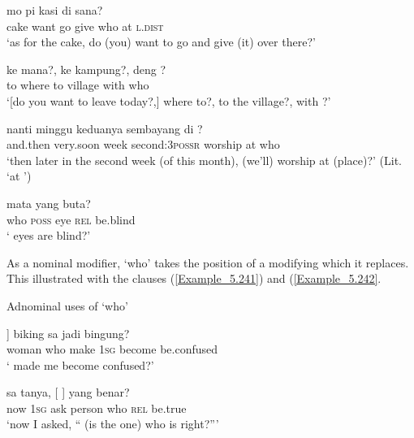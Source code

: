 \ea
\label{Example_5.237}
 {mo} {pi} {kasi} {} {di} {sana?}\\ %
 cake  want  go  give  who  at  \textsc{l.dist}\\
\glt 
‘as for the cake,  do (you) want to go and give (it) over there?’ \textstyleExampleSource{[080922-001a-CvPh.0670]}
\z

\ea
\label{Example_5.238}
\gll {{\ldots}} {ke} {mana?,} {ke} {kampung?,} {deng} {?}\\ %
  { }  to  where  to  village  with  who\\
 ‘[do you want to leave today?,] where to?, to the village?, with ?’ \textstyleExampleSource{[080917-003a-CvEx.0048-0044]}
\z

\ea
\label{Example_5.239}
 {nanti} {minggu} {keduanya} {sembayang} {di} {?}\\ %
 and.then  very.soon  week  second:\textsc{3possr}  worship  at  who\\
\glt 
‘then later in the second week (of this month), (we’ll) worship at  (place)?’ (Lit. ‘at ’) \textstyleExampleSource{[081011-005-Cv.0037]}
\z

\ea
\label{Example_5.240}
 {} {mata} {yang} {buta?}\\ %
 who  \textsc{poss}  eye  \textsc{rel}  be.blind\\
\glt 
‘ eyes are blind?’ \textstyleExampleSource{[080922-001a-CvPh.0142]}
\z



As a nominal modifier,  ‘who’ takes the position of a modifying  which it replaces. This illustrated with the  clauses (\ref{Example_5.241}) and (\ref{Example_5.242}.


\begin{styleExampleTitle}
Adnominal uses of  ‘who’
\end{styleExampleTitle}

\ea
\label{Example_5.241}
\gll {[\bluebold{prempuang}} {]} {biking} {sa} {jadi} {bingung?}\\ %
 woman  who  make  \textsc{1sg}  become  be.confused\\
\glt 
‘ made me become confused?’ \textstyleExampleSource{[080922-004-Cv.0028]}
\z

\ea
\label{Example_5.242}
 {sa} {tanya,} {[} {]} {yang} {benar?}\\ %
 now  \textsc{1sg}  ask  person  who  \textsc{rel}  be.true\\
\glt 
‘now I asked, `` (is the one) who is right?''' \textstyleExampleSource{[080917-010-CvEx.0197]}
\z


